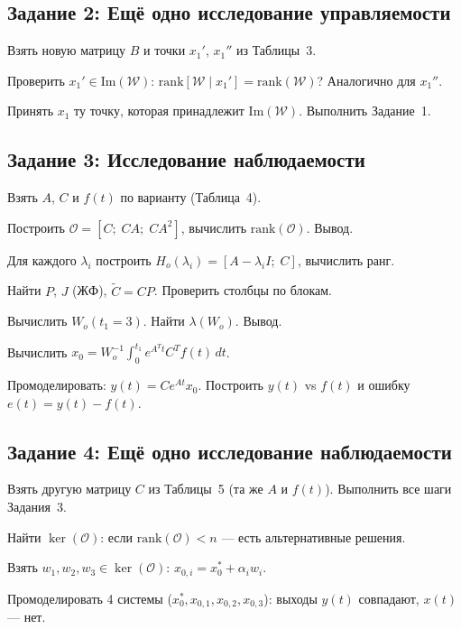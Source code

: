 \documentclass[12pt,a4paper]{article}
\begin{document}
	\subsection{Задание 2: Ещё одно исследование управляемости}
	\begin{algo}
		\item Взять новую матрицу $B$ и точки $x_1'$, $x_1''$ из Таблицы~3.
		\item Проверить $x_1' \in \mathrm{Im}(\mathcal{W})$: $\mathrm{rank}[\mathcal{W} \mid x_1'] = \mathrm{rank}(\mathcal{W})$? Аналогично для $x_1''$.
		\item Принять $x_1$ ту точку, которая принадлежит $\mathrm{Im}(\mathcal{W})$. Выполнить Задание~1.
	\end{algo}
	
	\subsection{Задание 3: Исследование наблюдаемости}
	\begin{algo}
		\item Взять $A$, $C$ и $f(t)$ по варианту (Таблица~4).
		\item Построить $\mathcal{O}=[C;\; CA;\; CA^2]$, вычислить $\mathrm{rank}(\mathcal{O})$. Вывод.
		\item Для каждого $\lambda_i$ построить $H_o(\lambda_i)=[A-\lambda_i I;\; C]$, вычислить ранг.
		\item Найти $P$, $J$ (ЖФ), $\tilde{C}=CP$. Проверить столбцы по блокам.
		\item Вычислить $W_o(t_1\!=\!3)$. Найти $\lambda(W_o)$. Вывод.
		\item Вычислить $x_0 = W_o^{-1} \int_0^{t_1} e^{A^Tt}C^T f(t)\,dt$.
		\item Промоделировать: $y(t)=Ce^{At}x_0$. Построить $y(t)$ vs $f(t)$ и ошибку $e(t)=y(t)-f(t)$.
	\end{algo}
	
	\subsection{Задание 4: Ещё одно исследование наблюдаемости}
	\begin{algo}
		\item Взять другую матрицу $C$ из Таблицы~5 (та же $A$ и $f(t)$). Выполнить все шаги Задания~3.
		\item Найти $\ker(\mathcal{O})$: если $\mathrm{rank}(\mathcal{O}) < n$ --- есть альтернативные решения.
		\item Взять $w_1,w_2,w_3 \in \ker(\mathcal{O})$: $x_{0,i} = x_0^* + \alpha_i w_i$.
		\item Промоделировать 4 системы ($x_0^*, x_{0,1}, x_{0,2}, x_{0,3}$): выходы $y(t)$ совпадают, $x(t)$ --- нет.
	\end{algo}
	
\end{document}
